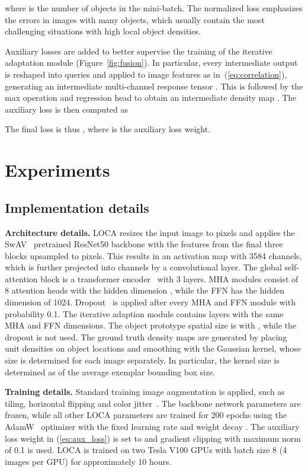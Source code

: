 \documentclass[10pt,twocolumn,letterpaper]{article}
\begin{document}
where  is the number of objects in the mini-batch.
The normalized loss emphasizes the errors in images with many objects, which usually contain the most challenging situations with high local object densities. 


Auxiliary losses are added to better supervise the training of the iterative adaptation module (Figure~\ref{fig:fusion}). 
In particular, every intermediate output  is reshaped into  queries  and applied to image features  as in~(\ref{eq:correlation}), generating an intermediate multi-channel response tensor . This is followed by the max operation and regression head to obtain an intermediate density map . The auxiliary loss is then computed as

The final loss is thus , where  is the auxiliary loss weight. 


\section{Experiments}

\subsection{Implementation details}



\textbf{Architecture details.} 
LOCA resizes the input image to  pixels and applies the SwAV~\cite{swav} pretrained ResNet50 backbone with the features from the final three blocks upsampled to  pixels. This results in an activation map with 3584 channels, which is further projected into  channels by a  convolutional layer. The global self-attention block is a transformer encoder~\cite{detr, transformer} with 3 layers. MHA modules consist of 8 attention heads with the hidden dimension , while the FFN has the hidden dimension of 1024. Dropout~\cite{dropout} is applied after every MHA and FFN module with probability 0.1. The iterative adaption module contains  layers with the same MHA and FFN dimensions. The object prototype spatial size is  with , while the dropout is not used. The ground truth density maps are generated by placing unit densities on object locations and smoothing with the Gaussian kernel, whose size is determined for each image separately. In particular, the kernel size is determined as  of the average exemplar bounding box size.



\textbf{Training details.} Standard training image augmentation is applied, such as tiling, horizontal flipping and color jitter~\cite{countr}. The backbone network parameters are frozen, while all other LOCA parameters are trained for 200 epochs using the AdamW~\cite{adamw} optimizer with the fixed learning rate  and weight decay . The auxiliary loss weight in (\ref{eq:aux_loss}) is set to  and gradient clipping with maximum norm of 0.1 is used. LOCA is trained on two Tesla V100 GPUs with batch size 8 (4 images per GPU) for approximately 10 hours.
\end{document}

